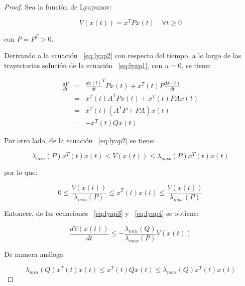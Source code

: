     \begin{proof}
        Sea la función de Lyapunov:

        \begin{equation} \label{eq:lyap2}
            V(x(t)) = x^T P x(t) \quad \forall t \ge 0
        \end{equation}

        con $P = P^T > 0$.

        Derivando a la ecuación ~\ref{eq:lyap2} con respecto del tiempo, a lo largo de las trayectorias solución de la ecuación ~\ref{eq:lyap1}, con $u = 0$, se tiene:

        \begin{eqnarray} \label{eq:lyap3}
            \frac{dV}{dt} & = & \frac{dx(t)}{dt}^T P x(t) + x^T(t) P \frac{dx(t)}{dt} \nonumber \\
            & = & x^T(t) A^T P x(t) + x^T(t) P A x(t) \nonumber \\
            & = & x^T(t) \left( A^T P + P A \right) x(t) \nonumber \\
            & = & -x^T(t) Q x(t)
        \end{eqnarray}

        Por otro lado, de la ecuación ~\ref{eq:lyap2} se tiene:

        \begin{equation*}
            \lambda_{min}(P) x^T(t) x(t) \le V(x(t)) \le \lambda_{max}(P) x^T(t) x(t)
        \end{equation*}

        por lo que:

        \begin{equation} \label{eq:lyap4}
            0 \le \frac{V(x(t))}{\lambda_{min}(P)} \le x^T(t) x(t) \le \frac{V(x(t))}{\lambda_{max}(P)}
        \end{equation}

        Entonces, de las ecuaciones ~\ref{eq:lyap3} y ~\ref{eq:lyap4} se obtiene:

        \begin{equation} \label{eq:lyap5}
            \frac{dV(x(t))}{dt} \le - \frac{\lambda_{min}(Q)}{\lambda_{max}(P)} V(x(t))
        \end{equation}

        De manera análoga

        \begin{equation*}
            \lambda_{min}(Q) x^T(t) x(t) \le x^T(t) Q x(t) \le \lambda_{max}(Q) x^T(t) x(t)
        \end{equation*}


\end{proof}
